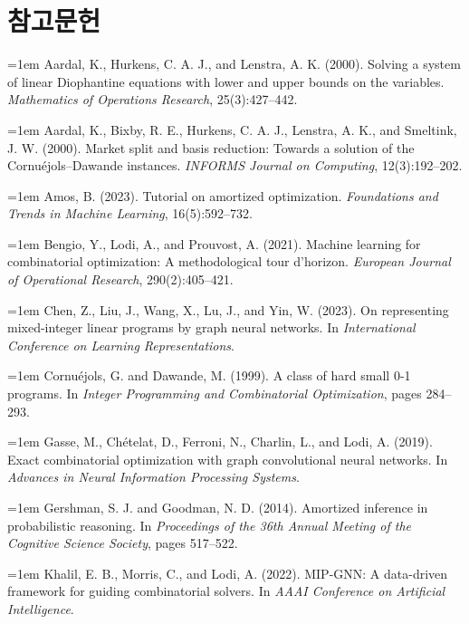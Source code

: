 \documentclass[final,5p,twocolumn]{elsarticle}
\begin{document}
\section*{참고문헌}
{\small
\noindent\hangindent=1em Aardal, K., Hurkens, C. A. J., and Lenstra, A. K. (2000). Solving a system of linear Diophantine equations with lower and upper bounds on the variables. \textit{Mathematics of Operations Research}, 25(3):427–442.\par\smallskip
\noindent\hangindent=1em Aardal, K., Bixby, R. E., Hurkens, C. A. J., Lenstra, A. K., and Smeltink, J. W. (2000). Market split and basis reduction: Towards a solution of the Cornuéjols–Dawande instances. \textit{INFORMS Journal on Computing}, 12(3):192–202.\par\smallskip
\noindent\hangindent=1em Amos, B. (2023). Tutorial on amortized optimization. \textit{Foundations and Trends in Machine Learning}, 16(5):592–732.\par\smallskip
\noindent\hangindent=1em Bengio, Y., Lodi, A., and Prouvost, A. (2021). Machine learning for combinatorial optimization: A methodological tour d’horizon. \textit{European Journal of Operational Research}, 290(2):405–421.\par\smallskip
\noindent\hangindent=1em Chen, Z., Liu, J., Wang, X., Lu, J., and Yin, W. (2023). On representing mixed-integer linear programs by graph neural networks. In \textit{International Conference on Learning Representations}.\par\smallskip
\noindent\hangindent=1em Cornuéjols, G. and Dawande, M. (1999). A class of hard small 0-1 programs. In \textit{Integer Programming and Combinatorial Optimization}, pages 284–293.\par\smallskip
\noindent\hangindent=1em Gasse, M., Chételat, D., Ferroni, N., Charlin, L., and Lodi, A. (2019). Exact combinatorial optimization with graph convolutional neural networks. In \textit{Advances in Neural Information Processing Systems}.\par\smallskip
\noindent\hangindent=1em Gershman, S. J. and Goodman, N. D. (2014). Amortized inference in probabilistic reasoning. In \textit{Proceedings of the 36th Annual Meeting of the Cognitive Science Society}, pages 517–522.\par\smallskip
\noindent\hangindent=1em Khalil, E. B., Morris, C., and Lodi, A. (2022). MIP-GNN: A data-driven framework for guiding combinatorial solvers. In \textit{AAAI Conference on Artificial Intelligence}.\par\smallskip
}
\end{document}

